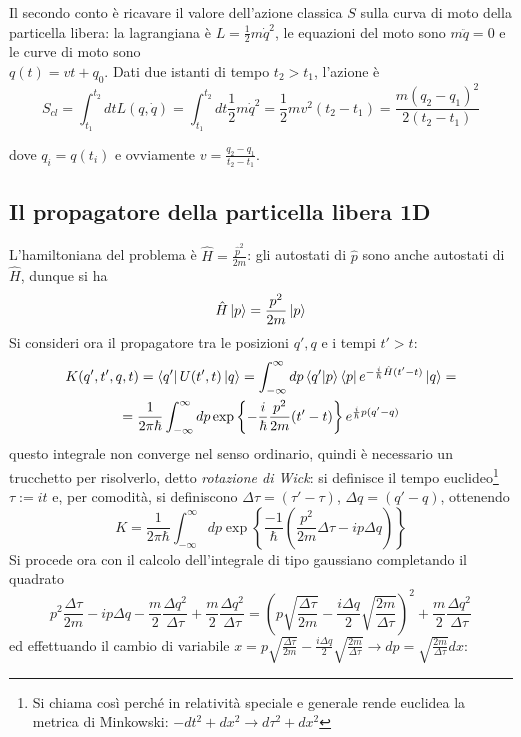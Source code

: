 Il secondo conto è ricavare il valore dell'azione classica $S$ sulla curva di moto della particella libera:
la lagrangiana è $L=\frac{1}{2}m\dot q^2$, le equazioni del moto sono $m\ddot{q}=0$ e le curve di moto sono\\
$q(t) = vt+q_0$. Dati due istanti di tempo $t_2>t_1$, l'azione è
\begin{equation}
S_{cl}=\int_{t_1}^{t_2}dtL(q,\dot q)=\int_{t_1}^{t_2}dt\frac{1}{2}m\dot{q}^2=\frac{1}{2}mv^2(t_2-t_1)
=\frac{m(q_2-q_1)^2}{2(t_2-t_1)}
\label{eq:S_cl_free}
\end{equation}

dove $q_i = q(t_i)$ e ovviamente $v=\frac{q_2-q_1}{t_2-t_1}$.

\subsection{Il propagatore della particella libera 1D}
L'hamiltoniana del problema è $\hat H=\frac{\hat p^2}{2m}$: gli autostati di $\hat p$ sono anche autostati
di $\hat H$, dunque si ha
$$\hat H \ket{p}=\frac{p^2}{2m}\ket{p}$$
Si consideri ora il propagatore tra le posizioni $q',q$ e i tempi $t'>t$:
\begin{gather*}
K(q',t',q,t) = \bra{q'}U(t',t)\ket{q} =
\int_{-\infty}^{\infty} dp \bra{q'}\ket{p}\bra{p}e^{-\frac{i}{\hbar}\hat H(t'-t)}\ket{q} =\\
=\frac{1}{2\pi\hbar}\int_{-\infty}^{\infty}dp \exp\left\{-\frac{i}{\hbar}\frac{p^2}{2m}(t'-t)\right\}
e^{\frac{i}{\hbar}p(q'-q)}
\end{gather*}
questo integrale non converge nel senso ordinario, quindi è necessario un trucchetto per risolverlo, detto
\textit{rotazione di Wick}: si definisce il tempo euclideo\footnote{
Si chiama così perché in relatività speciale e generale rende euclidea la metrica di Minkowski:
$-dt^2+dx^2 \rightarrow d\tau^2+dx^2$}
$\tau :=it$ e, per comodità, si definiscono $\Delta\tau = (\tau'-\tau)$, $\Delta q=(q'-q)$, ottenendo
$$ K = \frac{1}{2\pi\hbar}\int_{-\infty}^{\infty}dp\exp\left\{\frac{-1}{\hbar}\left(\frac{p^2}{2m}
\Delta\tau-ip\Delta q\right)\right\} $$
Si procede ora con il calcolo dell'integrale di tipo gaussiano completando il quadrato
$$p^2\frac{\Delta\tau}{2m}-ip\Delta q - \frac{m}{2}\frac{\Delta q^2}{\Delta\tau}+\frac{m}{2}\frac{\Delta q^2}
{\Delta\tau}= \left(p\sqrt{\frac{\Delta\tau}{2m}}-\frac{i\Delta q}{2}\sqrt{\frac{2m}{\Delta\tau}}\right)^2 +
\frac{m}{2}\frac{\Delta q^2}{\Delta\tau}$$
ed effettuando il cambio di variabile $x=p\sqrt{\frac{\Delta\tau}{2m}}-\frac{i\Delta q}{2}\sqrt{\frac{2m}{\Delta\tau}}\rightarrow dp = \sqrt{\frac{2m}{\Delta\tau}}dx$:
